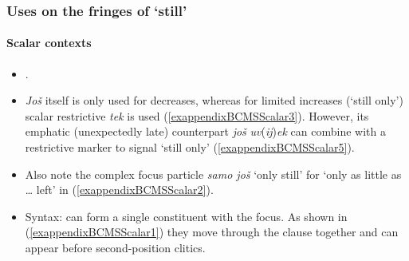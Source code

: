 \subsubsection{Uses on the fringes of \lq{}still\rq{}}

\paragraph{Scalar contexts}\label{appendixBCMSScalar}
\begin{itemize}
	\item \textcite{Prajnkovic2018}.
	\item \textit{Još} itself is only used for decreases, whereas for limited increases (\lq still only')  scalar restrictive \textit{tek} is used (\ref{exappendixBCMSScalar3}). However, its emphatic (unexpectedly late) counterpart \textit{još} \mbox{\textit{uv}(\textit{ij})\textit{ek}} can combine with a restrictive marker to signal \lq still only\rq{ }(\ref{exappendixBCMSScalar5}).
	\item Also note the complex focus particle \textit{samo još} \lq only still' for \lq only as little as … left' in (\ref{exappendixBCMSScalar2}).
	\item Syntax: can form a single constituent with the focus. As shown in (\ref{exappendixBCMSScalar1}) they move through the clause together and can appear before second-position clitics.
\end{itemize}
\pagebreak
